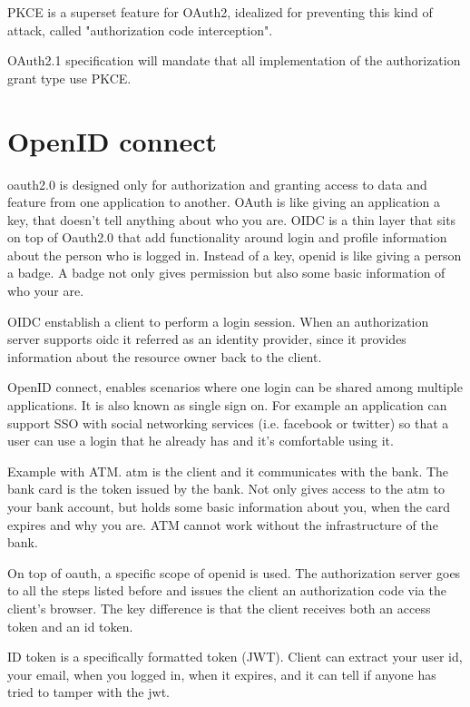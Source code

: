 \documentclass[20pt]{style}
\begin{document}
PKCE is a superset feature for OAuth2, idealized for preventing this kind of
attack, called "authorization code interception".

OAuth2.1 specification will mandate that all implementation of the authorization
grant type use PKCE.

\section{OpenID connect}

oauth2.0 is designed only for authorization and granting access to data and
feature from one application to another.
OAuth is like giving an application a key, that doesn't tell anything about who
you are.
OIDC is a thin layer that sits on top of Oauth2.0 that add functionality around
login and profile information about the person who is logged in.
Instead of a key, openid is like giving a person a badge. A badge not only gives
permission but also some basic information of who your are.

OIDC enstablish a client to perform a login session.
When an authorization server supports oidc it referred as an identity provider,
since it provides information about the resource owner back to the client.

OpenID connect, enables scenarios where one login can be shared among multiple
applications. It is also known as single sign on.
For example an application can support SSO with social networking services (i.e.
facebook or twitter) so that a user can use a login that he already has and it's
comfortable using it.

Example with ATM. atm is the client and it communicates with the bank. The bank
card is the token issued by the bank. Not only gives access to the atm to your
bank account, but holds some basic information about you, when the card expires
and why you are.
ATM cannot work without the infrastructure of the bank.

On top of oauth, a specific scope of openid is used. The authorization server
goes to all the steps listed before and issues the client an authorization code
via the client's browser.
The key difference is that the client receives both an access token and an id
token.

ID token is a specifically formatted token (JWT). Client can extract your user
id, your email, when you logged in, when it expires, and it can tell if anyone
has tried to tamper with the jwt.
\end{document}
